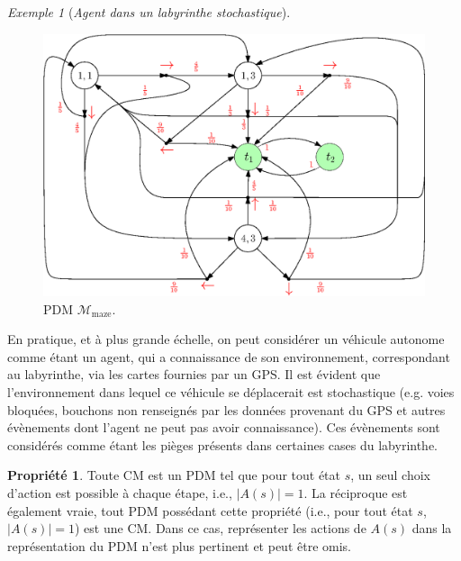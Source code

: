 \documentclass[12pt,a4paper]{report}
\theoremstyle{definition}%
\newtheorem{propriete}{Propriété}[chapter]
\theoremstyle{remark}
\newtheorem{example}{Exemple}[chapter]
\begin{document}
\begin{example}[\textit{Agent dans un labyrinthe stochastique}]
\begin{figure}[H]
		\includegraphics[scale=0.75]{figures/mazePDM}
		\caption{PDM $\mathcal{M}_{\text{maze}}$.}
		\label{PDM-maze-figure}
	\end{figure}

	En pratique, et à plus grande échelle, on peut considérer un véhicule autonome comme étant un agent,
	qui a connaissance de son environnement, correspondant au labyrinthe, via les cartes fournies par un GPS.
	Il est évident que l'environnement dans lequel ce véhicule se déplacerait
	est stochastique (e.g. voies bloquées, bouchons non renseignés par les
	données provenant du GPS et autres évènements dont l'agent ne peut pas
	avoir connaissance). Ces évènements sont considérés comme étant
	les pièges présents dans certaines cases du labyrinthe.

\end{example}

\begin{propriete} \label{PDM=CM}
	Toute CM est un PDM tel que pour tout état $s$, un seul choix d'action est
	possible à chaque étape, i.e., $|A(s)| = 1$. La réciproque est également vraie, tout
	PDM possédant cette propriété (i.e., pour tout état $s$, $|A(s)| = 1$) est une
	CM. Dans ce cas, représenter les actions de $A(s)$ dans la représentation du PDM n'est plus pertinent et peut être omis.
\end{propriete}
\end{document}

